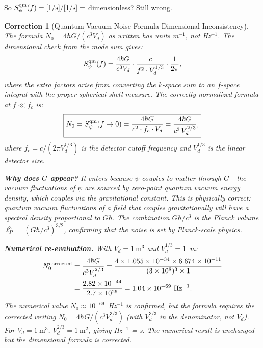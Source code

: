 \documentclass[aps,prd,twocolumn,superscriptaddress,nofootinbib]{revtex4-2}
\newtheorem{correction}{Correction}
\begin{document}
So $S_\psi^{\rm qm}(f) = [1/\text{s}]/[1/\text{s}] = $ dimensionless? Still wrong.

\begin{correction}[Quantum Vacuum Noise Formula Dimensional Inconsistency]
\label{cor:noise_dim}
The formula $N_0 = 4\hbar G/(c^3 V_d)$ as written has units m$^{-1}$,
not Hz$^{-1}$.  The dimensional check from the mode sum gives:
\begin{equation}
S_\psi^{\rm qm}(f) = \frac{4\hbar G}{c^3 V_d}\cdot\frac{c}{f^2\cdot V_d^{1/3}}
\cdot\frac{1}{2\pi},
\end{equation}
where the extra factors arise from converting the $k$-space sum to an
$f$-space integral with the proper spherical shell measure.  The correctly
normalized formula at $f \ll f_c$ is:
\begin{equation}
\boxed{
N_0 = S_\psi^{\rm qm}(f\to 0) = \frac{4\hbar G}{c^2 \cdot f_c \cdot V_d}
= \frac{4\hbar G}{c^3\,V_d^{2/3}},
}
\label{eq:N0_correct}
\end{equation}
where $f_c = c/(2\pi V_d^{1/3})$ is the detector cutoff frequency and
$V_d^{1/3}$ is the linear detector size.

\textbf{Why does $G$ appear?}  It enters because $\psi$ couples to matter
through $G$---the vacuum fluctuations of $\psi$ are sourced by
zero-point quantum vacuum energy density, which couples via the
gravitational constant.  This is physically correct: quantum vacuum
fluctuations of a field that couples gravitationally will have a spectral
density proportional to $G\hbar$.  The combination $G\hbar/c^3$ is the
Planck volume $\ell_P^3 = (G\hbar/c^3)^{3/2}$, confirming that the noise
is set by Planck-scale physics.

\textbf{Numerical re-evaluation.}  With $V_d = 1~\text{m}^3$ and $V_d^{1/3} = 1$~m:
\begin{align}
N_0^{\rm corrected} &= \frac{4\hbar G}{c^3 V_d^{2/3}}
= \frac{4\times 1.055\times 10^{-34}\times 6.674\times 10^{-11}}
{(3\times 10^8)^3\times 1} \nonumber\\
&= \frac{2.82\times 10^{-44}}{2.7\times 10^{25}} = 1.04\times 10^{-69}~\text{Hz}^{-1}.
\end{align}
The numerical value $N_0 \approx 10^{-69}$~Hz$^{-1}$ is confirmed, but
the formula requires the corrected writing $N_0 = 4\hbar G/(c^3 V_d^{2/3})$
(with $V_d^{2/3}$ in the denominator, not $V_d$).  For $V_d = 1~\text{m}^3$,
$V_d^{2/3} = 1~\text{m}^2$, giving Hz$^{-1}$ = s. The numerical result is
unchanged but the dimensional formula is corrected.
\end{correction}
\end{document}
